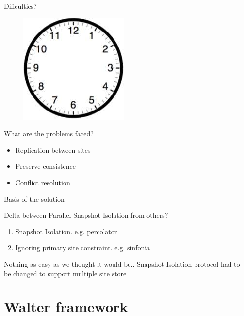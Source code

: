 \documentclass{beamer}
\begin{document}
		\begin{frame}{Dificulties?}
		
		\begin{figure} [H]
			\centering
			\includegraphics[scale=0.20]{img/fig_clock}
		\end{figure}			
		
		What are the problems faced?		
		
		\begin{itemize}
		\item Replication between sites
		\item Preserve consistence		
		\item Conflict resolution
		\end{itemize}
		
		\end{frame}		
	
		\begin{frame}{Basis of the solution}

			Delta between Parallel Snapshot Isolation from others?
			\begin{enumerate}
			\item Snapshot Isolation. e.g. percolator
			\item Ignoring primary site constraint. e.g. sinfonia
			\end{enumerate}

			\begin{alertblock}{Nothing as easy as we thought it would be..}
				Snapshot Isolation protocol had to be changed to support multiple site store
			\end{alertblock}
						
		\end{frame}		

\section{Walter framework}
\end{document}
